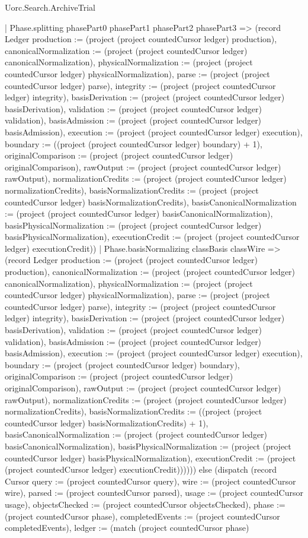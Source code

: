 \begin{lexlean}{Uorc.Search.ArchiveTrial}
\begin{semanticmodule}
{{      | Phase.splitting phasePart0 phasePart1 phasePart2 phasePart3 => (record Ledger {production := (project (project countedCursor ledger) production), canonicalNormalization := (project (project countedCursor ledger) canonicalNormalization), physicalNormalization := (project (project countedCursor ledger) physicalNormalization), parse := (project (project countedCursor ledger) parse), integrity := (project (project countedCursor ledger) integrity), basisDerivation := (project (project countedCursor ledger) basisDerivation), validation := (project (project countedCursor ledger) validation), basisAdmission := (project (project countedCursor ledger) basisAdmission), execution := (project (project countedCursor ledger) execution), boundary := ((project (project countedCursor ledger) boundary) + 1), originalComparison := (project (project countedCursor ledger) originalComparison), rawOutput := (project (project countedCursor ledger) rawOutput), normalizationCredits := (project (project countedCursor ledger) normalizationCredits), basisNormalizationCredits := (project (project countedCursor ledger) basisNormalizationCredits), basisCanonicalNormalization := (project (project countedCursor ledger) basisCanonicalNormalization), basisPhysicalNormalization := (project (project countedCursor ledger) basisPhysicalNormalization), executionCredit := (project (project countedCursor ledger) executionCredit)})
      | Phase.basisNormalizing classBasis classWire => (record Ledger {production := (project (project countedCursor ledger) production), canonicalNormalization := (project (project countedCursor ledger) canonicalNormalization), physicalNormalization := (project (project countedCursor ledger) physicalNormalization), parse := (project (project countedCursor ledger) parse), integrity := (project (project countedCursor ledger) integrity), basisDerivation := (project (project countedCursor ledger) basisDerivation), validation := (project (project countedCursor ledger) validation), basisAdmission := (project (project countedCursor ledger) basisAdmission), execution := (project (project countedCursor ledger) execution), boundary := (project (project countedCursor ledger) boundary), originalComparison := (project (project countedCursor ledger) originalComparison), rawOutput := (project (project countedCursor ledger) rawOutput), normalizationCredits := (project (project countedCursor ledger) normalizationCredits), basisNormalizationCredits := ((project (project countedCursor ledger) basisNormalizationCredits) + 1), basisCanonicalNormalization := (project (project countedCursor ledger) basisCanonicalNormalization), basisPhysicalNormalization := (project (project countedCursor ledger) basisPhysicalNormalization), executionCredit := (project (project countedCursor ledger) executionCredit)}))}))) else (dispatch (record Cursor {query := (project countedCursor query), wire := (project countedCursor wire), parsed := (project countedCursor parsed), usage := (project countedCursor usage), objectsChecked := (project countedCursor objectsChecked), phase := (project countedCursor phase), completedEvents := (project countedCursor completedEvents), ledger := (match (project countedCursor phase)
}}
\end{semanticmodule}
\end{lexlean}
